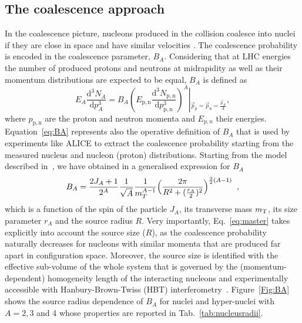 \documentclass{appolb}
\begin{document}
\subsection{The coalescence approach}
In the coalescence picture, nucleons produced in the collision coalesce into nuclei if they are close in space and have similar velocities \cite{Butler:1963, Kapusta:1980, Scheibl:1998tk}.
The coalescence probability is encoded in the coalescence parameter, $B_{A}$.
Considering that at LHC energies the number of produced protons and neutrons at midrapidity as well as their momentum distributions are expected to be equal, $B_{A}$ is defined as
%
%
\begin{equation}
E_{A}\frac{\mathrm{d}^{3}N_{A}}{\mathrm{d}p_{A}^{3}}=B_{A}{\left(E_{\mathrm{p,n}}\frac{\mathrm{d}^{3}N_{\mathrm{p,n}}}{\mathrm{d}p_{\mathrm{p,n}}^{3}}\right)^{A}}\left\vert_{\vec{p}_{\mathrm{p}}=\vec{p}_{\mathrm{n}}=\frac{\vec{p}_{A}}{A}} \right.,
\label{eq:BA}
\end{equation}
%
%
where $p_{\mathrm{p,n}}$ are the proton and neutron momenta and $E_{p,n}$ their energies. 
Equation~\ref{eq:BA} represents also the operative definition of $B_A$ that is used by experiments like ALICE to extract the coalescence probability starting from the measured nucleus and nucleon (proton) distributions.
Starting from the model described in~\cite{Scheibl:1998tk, Blum:2017qnn}, we have obtained in \cite{Bellini:2018epz} a generalised expression for $B_A$
%
%
\begin{equation}\label{eq:master}
B_{A} = {2J_{A} + 1 \over 2^{A}} {1 \over \sqrt{A}} {1 \over m_{T}^{A-1}} \Bigl({2\pi \over R^2 + ({r_A \over 2})^2 }\Bigr)^{\frac{3}{2}(A-1)} \;\;,
\end{equation}
%
%
\noindent which is a function of the spin of the particle $J_A$, its transverse mass $m_{\rm T}$, its size parameter $r_A$ and the source radius $R$. Very importantly, Eq.~\ref{eq:master} takes explicitly into account the source size ($R$), as the coalescence probability naturally decreases for nucleons with similar momenta that are produced far apart in configuration space. 
Moreover, the source size is identified with the  effective sub-volume of the whole system that is governed by the (momentum-dependent) homogeneity length of the interacting nucleons and experimentally accessible with Hanbury-Brown-Twiss (HBT) interferometry~\cite{Scheibl:1998tk, Blum:2017qnn}. 
Figure~\ref{Fig:BA} shows the source radius dependence of $B_A$ for nuclei and hyper-nuclei with $A = 2, 3$ and 4 whose properties are reported in Tab.~\ref{tab:nucleusradii}. 
\end{document}
